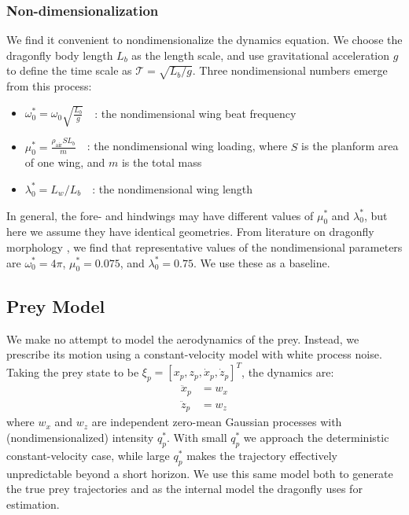 \documentclass[12pt]{article}
\begin{document}
\subsubsection{Non-dimensionalization}

We find it convenient to nondimensionalize the dynamics equation.
We choose the dragonfly body length $L_b$ as the length scale, and use
gravitational acceleration $g$ to define the time scale as $\mathcal{T} = \sqrt{L_b / g}$.
Three nondimensional numbers emerge from this process:
\begin{itemize}
    \item $\omega_0^* = \omega_0 \sqrt{\frac{L_b}{g}} \quad$: the nondimensional wing beat frequency
    \item $\mu_0^* = \frac{\rho_\text{air} S L_b}{m} \quad$: the nondimensional wing loading, where $S$ is the planform area of one wing, and $m$ is the total mass
    \item $\lambda_0^* = L_w / L_b \quad$: the nondimensional wing length
\end{itemize}
In general, the fore- and hindwings may have different values
of $\mu_0^*$ and $\lambda_0^*$, but here we assume they have
identical geometries. From literature on dragonfly morphology \cite{wakeling1997},
we find that representative values of the nondimensional parameters
are $\omega_0^* = 4\pi$, $\mu_0^* = 0.075$, and $\lambda_0^* = 0.75$.
We use these as a baseline.

\subsection{Prey Model}

We make no attempt to model the aerodynamics of the prey. Instead, we
prescribe its motion using a constant-velocity model with white
process noise. Taking the prey state to be $\xi_p = [x_p, z_p, \dot{x}_p, \dot{z}_p]^T$,
the dynamics are:
\begin{align}
    \ddot{x}_p &= w_x \\
    \ddot{z}_p &= w_z
\end{align}
where $w_x$ and $w_z$ are independent zero-mean Gaussian processes with
(nondimensionalized) intensity $q_p^*$. With small $q_p^*$ we approach
the deterministic constant-velocity case,
while large $q_p^*$ makes the trajectory effectively unpredictable beyond a
short horizon. We use this same model both to generate the true prey
trajectories and as the internal model the dragonfly uses for estimation.
\end{document}
